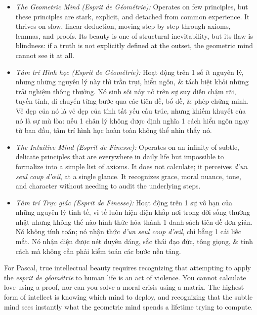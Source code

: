 \documentclass[11pt]{article}
\begin{document}
\begin{itemize}
    \item \emph{The Geometric Mind (Esprit de G\'eom\'etrie):} Operates on few principles, but these principles are stark, explicit, and detached from common experience. It thrives on slow, linear deduction, moving step by step through axioms, lemmas, and proofs. Its beauty is one of structural inevitability, but its flaw is blindness: if a truth is not explicitly defined at the outset, the geometric mind cannot see it at all.

\item \emph{Tâm trí Hình học (Esprit de G\'eom\'etrie):} Hoạt động trên 1 số ít nguyên lý, nhưng những nguyên lý này thì trần trụi, hiển ngôn, \& tách biệt khỏi những trải nghiệm thông thường. Nó sinh sôi nảy nở trên sự suy diễn chậm rãi, tuyến tính, di chuyển từng bước qua các tiên đề, bổ đề, \& phép chứng minh. Vẻ đẹp của nó là vẻ đẹp của tính tất yếu cấu trúc, nhưng khiếm khuyết của nó là sự mù lòa: nếu 1 chân lý không được định nghĩa 1 cách hiển ngôn ngay từ ban đầu, tâm trí hình học hoàn toàn không thể nhìn thấy nó.

\item \emph{The Intuitive Mind (Esprit de Finesse):} Operates on an infinity of subtle, delicate principles that are everywhere in daily life but impossible to formalize into a simple list of axioms. It does not calculate; it perceives \textit{d'un seul coup d'\oe il}, at a single glance. It recognizes grace, moral nuance, tone, and character without needing to audit the underlying steps.

\item \emph{Tâm trí Trực giác (Esprit de Finesse):} Hoạt động trên 1 sự vô hạn của những nguyên lý tinh tế, vi tế luôn hiện diện khắp nơi trong đời sống thường nhật nhưng không thể nào hình thức hóa thành 1 danh sách tiên đề đơn giản. Nó không tính toán; nó nhận thức \textit{d'un seul coup d'\oe il}, chỉ bằng 1 cái liếc mắt. Nó nhận diện được nét duyên dáng, sắc thái đạo đức, tông giọng, \& tính cách mà không cần phải kiểm toán các bước nền tảng.
\end{itemize}

For Pascal, true intellectual beauty requires recognizing that attempting to apply the \textit{esprit de g\'eom\'etrie} to human life is an act of violence. You cannot calculate love using a proof, nor can you solve a moral crisis using a matrix. The highest form of intellect is knowing which mind to deploy, and recognizing that the subtle mind sees instantly what the geometric mind spends a lifetime trying to compute.
\end{document}
